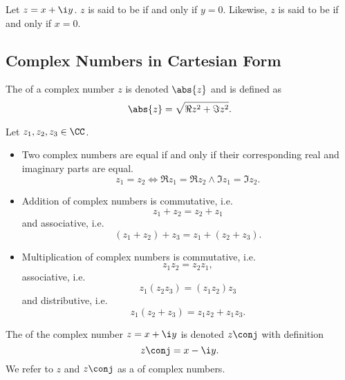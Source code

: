 \begin{definition}
    Let $z = x + \i y$. $z$ is said to be  if and only if $y = 0$. Likewise, $z$ is said to be  if and only if $x = 0$.
\end{definition}

\subsection{Complex Numbers in Cartesian Form}

\begin{definition}
    The  of a complex number $z$ is denoted $\abs{z}$ and is defined as \[\abs{z} = \sqrt{\Re{z}^2 + \Im{z}^2}.\]
\end{definition}

\begin{fact}
    Let $z_1, z_2, z_3 \in \CC$.
    \begin{itemize}
        \item Two complex numbers are equal if and only if their corresponding real and imaginary parts are equal. \[z_1 = z_2 \iff \Re z_1 = \Re z_2 \land \Im z_1 = \Im z_2.\]
        \item Addition of complex numbers is commutative, i.e. \[z_1 + z_2 = z_2 + z_1\] and associative, i.e. \[(z_1 + z_2) + z_3 = z_1 + (z_2 + z_3).\]
        \item Multiplication of complex numbers is commutative, i.e. \[z_1z_2 = z_2z_1,\] associative, i.e. \[z_1(z_2z_3) = (z_1z_2)z_3\] and distributive, i.e. \[z_1(z_2 + z_3) = z_1z_2 + z_1z_3.\]
    \end{itemize}
\end{fact}

\begin{definition}
    The  of the complex number $z = x + \i y$ is denoted $z\conj$ with definition \[z\conj = x - \i y.\] We refer to $z$ and $z\conj$ as a  of complex numbers.
\end{definition}

